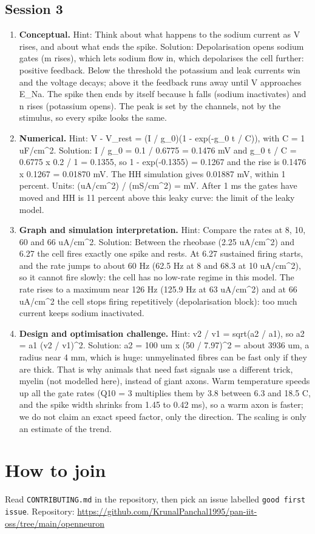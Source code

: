 \documentclass[11pt,a4paper]{article}
\begin{document}
\subsection*{Session 3}
\begin{enumerate}[nosep]
\item \textbf{Conceptual.} Hint: Think about what happens to the sodium current as V rises, and about what ends the spike. Solution: Depolarisation opens sodium gates (m rises), which lets sodium flow in, which depolarises the cell further: positive feedback. Below the threshold the potassium and leak currents win and the voltage decays; above it the feedback runs away until V approaches E\_Na. The spike then ends by itself because h falls (sodium inactivates) and n rises (potassium opens). The peak is set by the channels, not by the stimulus, so every spike looks the same.
\item \textbf{Numerical.} Hint: V - V\_rest = (I / g\_0)(1 - exp(-g\_0 t / C)), with C = 1 uF/cm\textasciicircum{}2. Solution: I / g\_0 = 0.1 / 0.6775 = 0.1476 mV and g\_0 t / C = 0.6775 x 0.2 / 1 = 0.1355, so 1 - exp(-0.1355) = 0.1267 and the rise is 0.1476 x 0.1267 = 0.01870 mV. The HH simulation gives 0.01887 mV, within 1 percent. Units: (uA/cm\textasciicircum{}2) / (mS/cm\textasciicircum{}2) = mV. After 1 ms the gates have moved and HH is 11 percent above this leaky curve: the limit of the leaky model.
\item \textbf{Graph and simulation interpretation.} Hint: Compare the rates at 8, 10, 60 and 66 uA/cm\textasciicircum{}2. Solution: Between the rheobase (2.25 uA/cm\textasciicircum{}2) and 6.27 the cell fires exactly one spike and rests. At 6.27 sustained firing starts, and the rate jumps to about 60 Hz (62.5 Hz at 8 and 68.3 at 10 uA/cm\textasciicircum{}2), so it cannot fire slowly: the cell has no low-rate regime in this model. The rate rises to a maximum near 126 Hz (125.9 Hz at 63 uA/cm\textasciicircum{}2) and at 66 uA/cm\textasciicircum{}2 the cell stops firing repetitively (depolarisation block): too much current keeps sodium inactivated.
\item \textbf{Design and optimisation challenge.} Hint: v2 / v1 = sqrt(a2 / a1), so a2 = a1 (v2 / v1)\textasciicircum{}2. Solution: a2 = 100 um x (50 / 7.97)\textasciicircum{}2 = about 3936 um, a radius near 4 mm, which is huge: unmyelinated fibres can be fast only if they are thick. That is why animals that need fast signals use a different trick, myelin (not modelled here), instead of giant axons. Warm temperature speeds up all the gate rates (Q10 = 3 multiplies them by 3.8 between 6.3 and 18.5 C, and the spike width shrinks from 1.45 to 0.42 ms), so a warm axon is faster; we do not claim an exact speed factor, only the direction. The scaling is only an estimate of the trend.
\end{enumerate}

\section{How to join}
Read \texttt{CONTRIBUTING.md} in the repository, then pick an issue labelled \texttt{good first issue}. Repository: \url{https://github.com/KrunalPanchal1995/pan-iit-oss/tree/main/openneuron}
\end{document}
